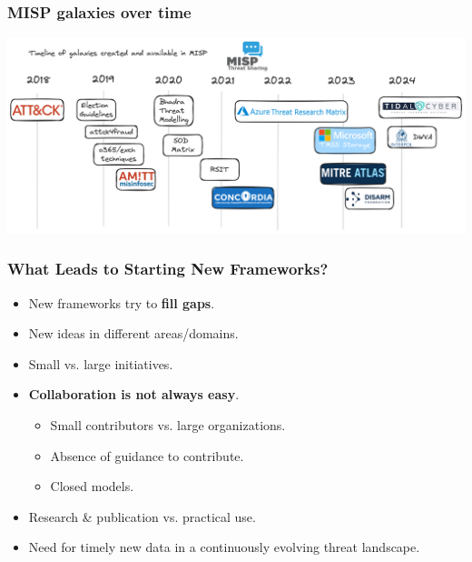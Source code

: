 \begin{frame}
	\frametitle{MISP galaxies over time}
	\begin{center}
	\includegraphics[scale=0.16]{./screenshots/timeline.png}
	\end{center}
\end{frame}

\begin{frame}
        \frametitle{What Leads to Starting New Frameworks?}
        \begin{itemize}
	\item New frameworks try to {\bf fill gaps}.
            \item New ideas in different areas/domains.
            \item Small vs. large initiatives.
	    \item {\bf Collaboration is not always easy}.
                \begin{itemize}
                    \item Small contributors vs. large organizations.
                    \item Absence of guidance to contribute.
                    \item Closed models.
                \end{itemize}
            \item Research \& publication vs. practical use.
            \item Need for timely new data in a continuously evolving threat landscape.
        \end{itemize}
\end{frame}

